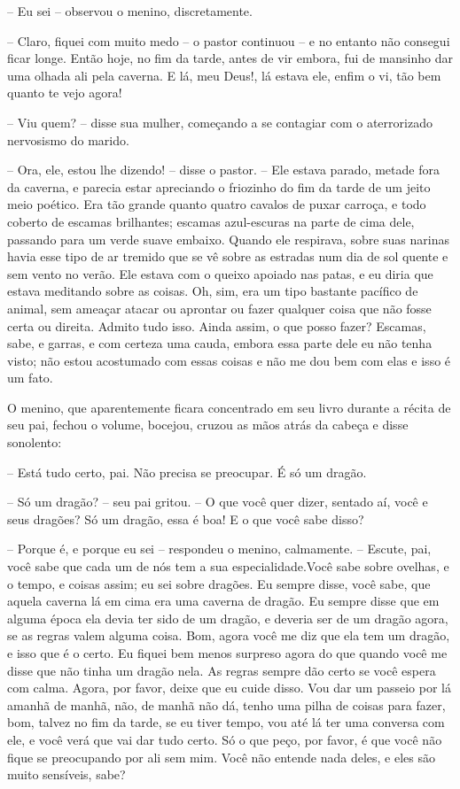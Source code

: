 -- Eu sei -- observou o menino, discretamente.

-- Claro, fiquei com muito medo -- o pastor continuou -- e no entanto não
consegui ficar longe. Então hoje, no fim da tarde, antes de vir
embora, fui de mansinho dar uma olhada ali pela caverna. E lá, meu
Deus!, lá estava ele, enfim o vi, tão bem quanto te vejo agora!

-- Viu quem? -- disse sua mulher, começando a se contagiar com o
aterrorizado nervosismo do marido.

-- Ora, ele, estou lhe dizendo! -- disse o pastor. -- Ele estava parado,
metade fora da caverna, e parecia estar apreciando o friozinho do fim
da tarde de um jeito meio poético. Era tão grande quanto quatro
cavalos de puxar carroça, e todo coberto de escamas brilhantes;
escamas azul-escuras na parte de cima dele, passando para um verde
suave embaixo. Quando ele respirava, sobre suas narinas havia esse
tipo de ar tremido que se vê sobre as estradas num dia de sol quente
e sem vento no verão. Ele estava com o queixo apoiado nas patas, e eu
diria que estava meditando sobre as coisas. Oh, sim, era um tipo
bastante pacífico de animal, sem ameaçar atacar ou aprontar ou fazer
qualquer coisa que não fosse certa ou direita. Admito tudo isso.
Ainda assim, o que posso fazer? Escamas, sabe, e garras, e com
certeza uma cauda, embora essa parte dele eu não tenha visto; não
estou acostumado com essas coisas e não me dou bem com elas e isso é
um fato.

O menino, que aparentemente ficara concentrado em seu livro durante a
récita de seu pai, fechou o volume, bocejou, cruzou as mãos atrás da
cabeça e disse sonolento:

-- Está tudo certo, pai. Não precisa se preocupar. É só um dragão.

-- Só um dragão? -- seu pai gritou. -- O que você quer dizer, sentado aí,
você e seus dragões? Só um dragão, essa é boa! E o que você sabe
disso?

-- Porque é, e porque eu sei -- respondeu o menino, calmamente. --
Escute, pai, você sabe que cada um de nós tem a sua
especialidade.Você sabe sobre ovelhas, e o tempo, e coisas assim; eu
sei sobre dragões. Eu sempre disse, você sabe, que aquela caverna lá
em cima era uma caverna de dragão. Eu sempre disse que em alguma
época ela devia ter sido de um dragão, e deveria ser de um dragão
agora, se as regras valem alguma coisa. Bom, agora você me diz que
ela tem um dragão, e isso que é o certo. Eu fiquei bem menos surpreso
agora do que quando você me disse que não tinha um dragão nela. As
regras sempre dão certo se você espera com calma. Agora, por favor,
deixe que eu cuide disso. Vou dar um passeio por lá amanhã de manhã,
não, de manhã não dá, tenho uma pilha de coisas para fazer, bom,
talvez no fim da tarde, se eu tiver tempo, vou até lá ter uma
conversa com ele, e você verá que vai dar tudo certo. Só o que peço,
por favor, é que você não fique se preocupando por ali sem mim. Você
não entende nada deles, e eles são muito sensíveis, sabe?

